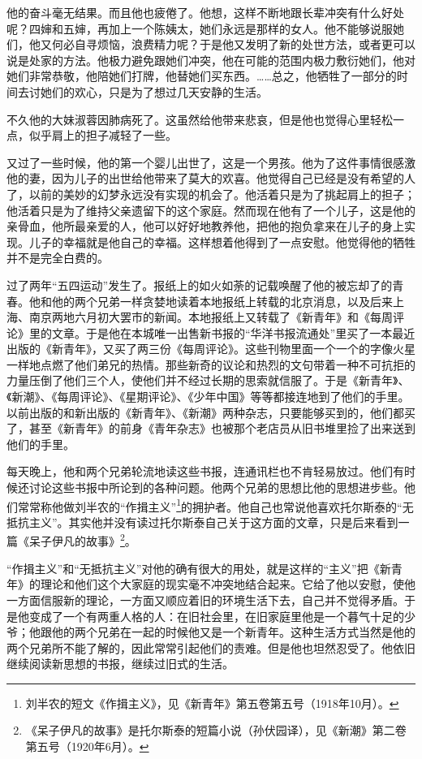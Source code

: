 \par 他的奋斗毫无结果。而且他也疲倦了。他想，这样不断地跟长辈冲突有什么好处呢？四婶和五婶，再加上一个陈姨太，她们永远是那样的女人。他不能够说服她们，他又何必自寻烦恼，浪费精力呢？于是他又发明了新的处世方法，或者更可以说是处家的方法。他极力避免跟她们冲突，他在可能的范围内极力敷衍她们，他对她们非常恭敬，他陪她们打牌，他替她们买东西。……总之，他牺牲了一部分的时间去讨她们的欢心，只是为了想过几天安静的生活。
\par 不久他的大妹淑蓉因肺病死了。这虽然给他带来悲哀，但是他也觉得心里轻松一点，似乎肩上的担子减轻了一些。
\par 又过了一些时候，他的第一个婴儿出世了，这是一个男孩。他为了这件事情很感激他的妻，因为儿子的出世给他带来了莫大的欢喜。他觉得自己已经是没有希望的人了，以前的美妙的幻梦永远没有实现的机会了。他活着只是为了挑起肩上的担子；他活着只是为了维持父亲遗留下的这个家庭。然而现在他有了一个儿子，这是他的亲骨血，他所最亲爱的人，他可以好好地教养他，把他的抱负拿来在儿子的身上实现。儿子的幸福就是他自己的幸福。这样想着他得到了一点安慰。他觉得他的牺牲并不是完全白费的。
\par 过了两年“五四运动”发生了。报纸上的如火如荼的记载唤醒了他的被忘却了的青春。他和他的两个兄弟一样贪婪地读着本地报纸上转载的北京消息，以及后来上海、南京两地六月初大罢市的新闻。本地报纸上又转载了《新青年》和《每周评论》里的文章。于是他在本城唯一出售新书报的“华洋书报流通处”里买了一本最近出版的《新青年》，又买了两三份《每周评论》。这些刊物里面一个一个的字像火星一样地点燃了他们弟兄的热情。那些新奇的议论和热烈的文句带着一种不可抗拒的力量压倒了他们三个人，使他们并不经过长期的思索就信服了。于是《新青年》、《新潮》、《每周评论》、《星期评论》、《少年中国》等等都接连地到了他们的手里。以前出版的和新出版的《新青年》、《新潮》两种杂志，只要能够买到的，他们都买了，甚至《新青年》的前身《青年杂志》也被那个老店员从旧书堆里捡了出来送到他们的手里。
\par 每天晚上，他和两个兄弟轮流地读这些书报，连通讯栏也不肯轻易放过。他们有时候还讨论这些书报中所论到的各种问题。他两个兄弟的思想比他的思想进步些。他们常常称他做刘半农的“作揖主义”\footnote{刘半农的短文《作揖主义》，见《新青年》第五卷第五号（1918年10月）。}的拥护者。他自己也常说他喜欢托尔斯泰的“无抵抗主义”。其实他并没有读过托尔斯泰自己关于这方面的文章，只是后来看到一篇《呆子伊凡的故事》\footnote{《呆子伊凡的故事》是托尔斯泰的短篇小说（孙伏园译），见《新潮》第二卷第五号（1920年6月）。}。
\par “作揖主义”和“无抵抗主义”对他的确有很大的用处，就是这样的“主义”把《新青年》的理论和他们这个大家庭的现实毫不冲突地结合起来。它给了他以安慰，使他一方面信服新的理论，一方面又顺应着旧的环境生活下去，自己并不觉得矛盾。于是他变成了一个有两重人格的人：在旧社会里，在旧家庭里他是一个暮气十足的少爷；他跟他的两个兄弟在一起的时候他又是一个新青年。这种生活方式当然是他的两个兄弟所不能了解的，因此常常引起他们的责难。但是他也坦然忍受了。他依旧继续阅读新思想的书报，继续过旧式的生活。
